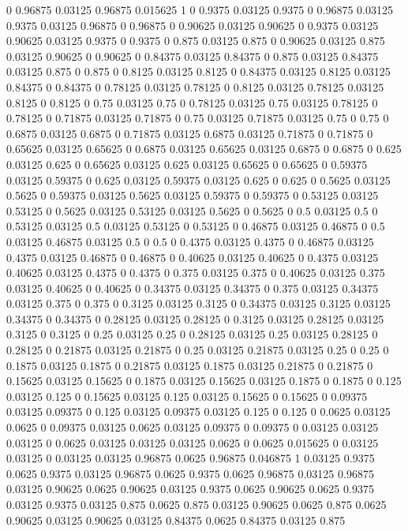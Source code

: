 0 0.96875
0.03125 0.96875
0.015625 1
0 0.9375
0.03125 0.9375
0 0.96875
0.03125 0.9375
0.03125 0.96875
0 0.96875
0 0.90625
0.03125 0.90625
0 0.9375
0.03125 0.90625
0.03125 0.9375
0 0.9375
0 0.875
0.03125 0.875
0 0.90625
0.03125 0.875
0.03125 0.90625
0 0.90625
0 0.84375
0.03125 0.84375
0 0.875
0.03125 0.84375
0.03125 0.875
0 0.875
0 0.8125
0.03125 0.8125
0 0.84375
0.03125 0.8125
0.03125 0.84375
0 0.84375
0 0.78125
0.03125 0.78125
0 0.8125
0.03125 0.78125
0.03125 0.8125
0 0.8125
0 0.75
0.03125 0.75
0 0.78125
0.03125 0.75
0.03125 0.78125
0 0.78125
0 0.71875
0.03125 0.71875
0 0.75
0.03125 0.71875
0.03125 0.75
0 0.75
0 0.6875
0.03125 0.6875
0 0.71875
0.03125 0.6875
0.03125 0.71875
0 0.71875
0 0.65625
0.03125 0.65625
0 0.6875
0.03125 0.65625
0.03125 0.6875
0 0.6875
0 0.625
0.03125 0.625
0 0.65625
0.03125 0.625
0.03125 0.65625
0 0.65625
0 0.59375
0.03125 0.59375
0 0.625
0.03125 0.59375
0.03125 0.625
0 0.625
0 0.5625
0.03125 0.5625
0 0.59375
0.03125 0.5625
0.03125 0.59375
0 0.59375
0 0.53125
0.03125 0.53125
0 0.5625
0.03125 0.53125
0.03125 0.5625
0 0.5625
0 0.5
0.03125 0.5
0 0.53125
0.03125 0.5
0.03125 0.53125
0 0.53125
0 0.46875
0.03125 0.46875
0 0.5
0.03125 0.46875
0.03125 0.5
0 0.5
0 0.4375
0.03125 0.4375
0 0.46875
0.03125 0.4375
0.03125 0.46875
0 0.46875
0 0.40625
0.03125 0.40625
0 0.4375
0.03125 0.40625
0.03125 0.4375
0 0.4375
0 0.375
0.03125 0.375
0 0.40625
0.03125 0.375
0.03125 0.40625
0 0.40625
0 0.34375
0.03125 0.34375
0 0.375
0.03125 0.34375
0.03125 0.375
0 0.375
0 0.3125
0.03125 0.3125
0 0.34375
0.03125 0.3125
0.03125 0.34375
0 0.34375
0 0.28125
0.03125 0.28125
0 0.3125
0.03125 0.28125
0.03125 0.3125
0 0.3125
0 0.25
0.03125 0.25
0 0.28125
0.03125 0.25
0.03125 0.28125
0 0.28125
0 0.21875
0.03125 0.21875
0 0.25
0.03125 0.21875
0.03125 0.25
0 0.25
0 0.1875
0.03125 0.1875
0 0.21875
0.03125 0.1875
0.03125 0.21875
0 0.21875
0 0.15625
0.03125 0.15625
0 0.1875
0.03125 0.15625
0.03125 0.1875
0 0.1875
0 0.125
0.03125 0.125
0 0.15625
0.03125 0.125
0.03125 0.15625
0 0.15625
0 0.09375
0.03125 0.09375
0 0.125
0.03125 0.09375
0.03125 0.125
0 0.125
0 0.0625
0.03125 0.0625
0 0.09375
0.03125 0.0625
0.03125 0.09375
0 0.09375
0 0.03125
0.03125 0.03125
0 0.0625
0.03125 0.03125
0.03125 0.0625
0 0.0625
0.015625 0
0.03125 0.03125
0 0.03125
0.03125 0.96875
0.0625 0.96875
0.046875 1
0.03125 0.9375
0.0625 0.9375
0.03125 0.96875
0.0625 0.9375
0.0625 0.96875
0.03125 0.96875
0.03125 0.90625
0.0625 0.90625
0.03125 0.9375
0.0625 0.90625
0.0625 0.9375
0.03125 0.9375
0.03125 0.875
0.0625 0.875
0.03125 0.90625
0.0625 0.875
0.0625 0.90625
0.03125 0.90625
0.03125 0.84375
0.0625 0.84375
0.03125 0.875
